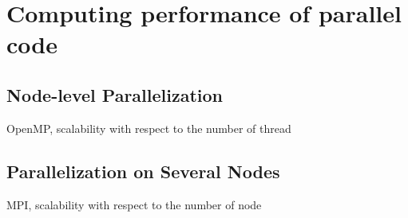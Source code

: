 
\chapter{Computing performance of parallel code\label{chpt:parallelization}}


\section{Node-level Parallelization}

OpenMP, scalability with respect to the number of thread


\section{Parallelization on Several Nodes}

MPI, scalability with respect to the number of node
